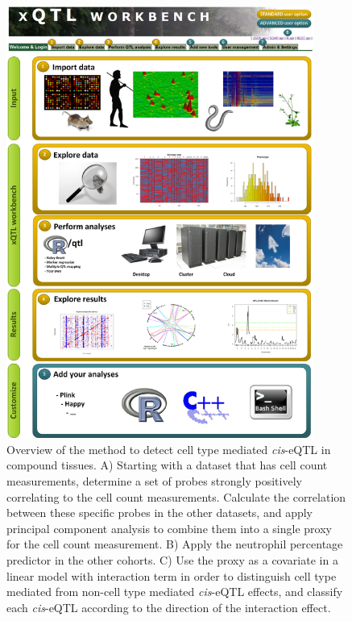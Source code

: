  \begin{figure}[h!]
  \centering
  \includegraphics[width=0.9\textwidth]{eps/image_4_4.eps}
  \caption[Methods overview]{Overview of the method to detect cell type mediated \emph{cis}-eQTL in compound 
           tissues. A) Starting with a dataset that has cell count measurements, determine a set of 
           probes strongly positively correlating to the cell count measurements. Calculate the 
           correlation between these specific probes in the other datasets, and apply principal 
           component analysis to combine them into a single proxy for the cell count measurement. B) 
           Apply the neutrophil percentage predictor in the other cohorts. C) Use the proxy as a 
           covariate in a linear model with interaction term in order to distinguish cell type mediated 
           from non-cell type mediated \emph{cis}-eQTL effects, and classify each \emph{cis}-eQTL according to the 
           direction of the interaction effect.}
          \label{fig:fig4_4}
  \end{figure}

